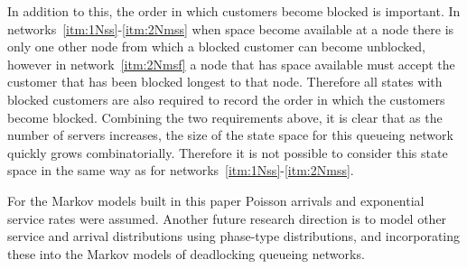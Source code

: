 \documentclass{article}
\numberwithin{equation}{section}
\begin{document}
In addition to this, the order in which customers become blocked is important. In networks~\ref{itm:1Nss}-\ref{itm:2Nmss} when space become available at a node there is only one other node from which a blocked customer can become unblocked, however in network~\ref{itm:2Nmsf} a node that has space available must accept the customer that has been blocked longest to that node. Therefore all states with blocked customers are also required to record the order in which the customers become blocked.
Combining the two requirements above, it is clear that as the number of servers increases, the size of the state space for this queueing network quickly grows combinatorially. Therefore it is not possible to consider this state space in the same way as for networks~\ref{itm:1Nss}-\ref{itm:2Nmss}.

For the Markov models built in this paper Poisson arrivals and exponential service rates were assumed.
Another future research direction is to model other service and arrival distributions using phase-type distributions, and incorporating these into the Markov models of deadlocking queueing networks.




\end{document}

